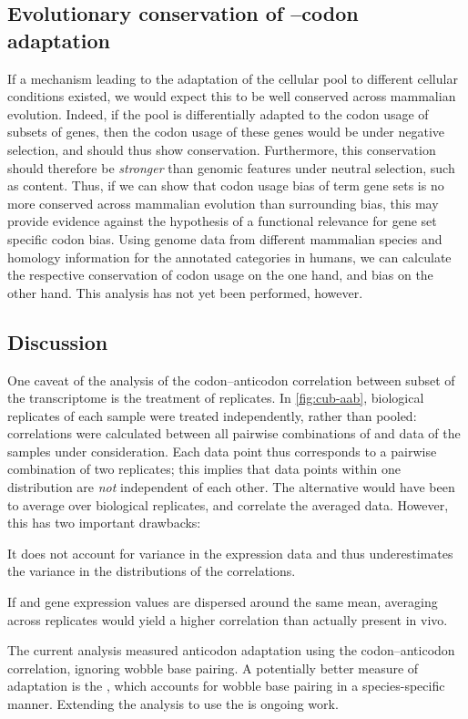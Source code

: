 \subsection{Evolutionary conservation of --codon adaptation}

If a mechanism leading to the adaptation of the cellular \trna pool to different
cellular conditions existed, we would expect this to be well conserved across
mammalian evolution. Indeed, if the \trna pool is differentially adapted to the
codon usage of subsets of genes, then the codon usage of these genes would be
under negative selection, and should thus show conservation. Furthermore, this
conservation should therefore be \emph{stronger} than genomic features under
neutral selection, such as \gc content. Thus, if we can show that codon usage
bias of \go term gene sets is no more conserved across mammalian evolution than
surrounding \gc bias, this may provide evidence against the hypothesis of a
functional relevance for gene set specific codon bias. Using genome data from
different mammalian species and homology information for the annotated \go
categories in humans, we can calculate the respective conservation of codon
usage on the one hand, and \gc bias on the other hand. This analysis has not yet
been performed, however.

\subsection{Discussion}

One caveat of the analysis of the codon--anticodon correlation between subset of
the transcriptome is the treatment of replicates. In \cref{fig:cub-aab},
biological replicates of each sample were treated independently, rather than
pooled: correlations were calculated between all pairwise combinations of
\rnaseq and  \chipseq data of the samples under consideration. Each data
point thus corresponds to a pairwise combination of two replicates; this implies
that data points within one distribution are \emph{not} independent of each
other. The alternative would have been to average over biological replicates,
and correlate the averaged data. However, this has two important drawbacks:
\begin{enumerate*}
    \item It does not account for variance in the expression data and thus
        underestimates the variance in the distributions of the correlations.
    \item If \mrna and \trna gene expression values are dispersed around the
        same mean, averaging across replicates would yield a higher correlation
        than actually present in vivo.
\end{enumerate*}

The current analysis measured \trna anticodon adaptation using the
codon--anticodon correlation, ignoring wobble base pairing. A potentially better
measure of \trna adaptation is the \tai, which accounts for wobble base pairing
in a species-specific manner. Extending the analysis to use the \tai is ongoing
work.
